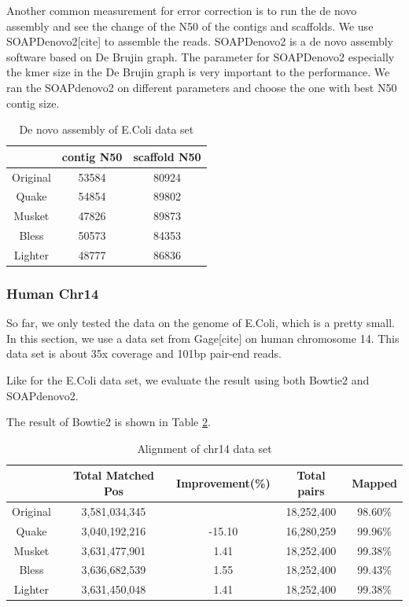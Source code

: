 \documentclass[10pt]{article}
\begin{document}
Another common measurement for error correction is to run the de novo assembly and see the change of the N50 of the contigs and scaffolds. We use SOAPDenovo2[cite] to assemble the reads. SOAPDenovo2 is a de novo assembly software based on De Brujin graph. The parameter for SOAPDenovo2 especially the kmer size in the De Brujin graph is very important to the performance. We ran the SOAPdenovo2 on different parameters and choose the one with best N50 contig size. 

\begin{table}
\begin{tabular}{|c|c|c|} \hline
	  & contig N50 & scaffold N50 \\ \hline 
Original  &	53584	&	80924 \\ \hline 
Quake &	54854	&	89802 \\ \hline 
Musket&	47826	&	89873 \\ \hline 
Bless &	50573	&	84353 \\ \hline 
Lighter &	48777	&	86836 \\ \hline 
\end{tabular}
\caption{De novo assembly of E.Coli data set\label{table:ecoli_sd2}}
\end{table}

\subsubsection*{Human Chr14}
So far, we only tested the data on the genome of E.Coli, which is a pretty small. In this section, we use a data set from Gage[cite] on human chromosome 14. This data set is about 35x coverage and 101bp pair-end reads.

Like for the E.Coli data set, we evaluate the result using both Bowtie2 and SOAPdenovo2.

The result of Bowtie2 is shown in Table \ref{table:chr14_bowtie2}.

\begin{table}
\begin{tabular}{|c|c|c|c|c|}\hline
  & Total Matched Pos & Improvement(\%) & Total pairs & Mapped \\ \hline
Original &	3,581,034,345	&	& 18,252,400 & 98.60\% \\ \hline
Quake	& 3,040,192,216	& -15.10 &	16,280,259 &	99.96\% \\ \hline
Musket	& 3,631,477,901	& 1.41	& 18,252,400	& 99.38\% \\ \hline
Bless	& 3,636,682,539	& 1.55	& 18,252,400	& 99.43\% \\ \hline
Lighter	& 3,631,450,048	& 1.41	& 18,252,400	& 99.38\% \\ \hline
\end{tabular}
\caption{Alignment of chr14 data set\label{table:chr14_bowtie2}}
\end{table}
\end{document}

